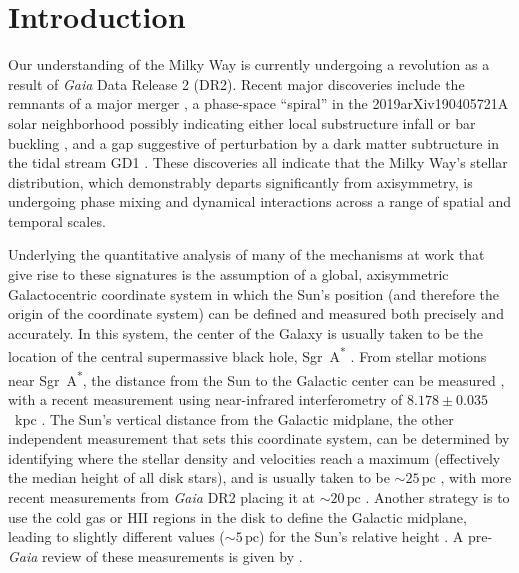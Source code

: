 \documentclass[twocolumn]{aastex62}
\newcommand{\pc}{\text{pc}}
\newcommand{\kpc}{\text{kpc}}
\begin{document}

\section{Introduction} \label{sec:intro}
Our understanding of the Milky Way is currently undergoing a
revolution 
     as a result of {\em Gaia} Data Release 2 (DR2).  Recent major discoveries include the remnants of a
major merger \citep{2018ApJ...860L..11K, 2018Natur.563...85H,
2018arXiv180704290L, 2019MNRAS.482.3426M}, a phase-space ``spiral'' in the 2019arXiv190405721A
solar neighborhood \citep{2018Natur.561..360A} possibly indicating either
local substructure infall \citep{2018MNRAS.481.1501B, 2018arXiv180800451L} or
bar buckling \citep{2018arXiv181109205K}, and a gap suggestive of perturbation
by a dark matter subtructure in the tidal stream GD1
\citep{2018ApJ...863L..20P, 2018arXiv181103631B}. These discoveries all
indicate that the Milky Way's stellar distribution, which demonstrably departs
significantly from axisymmetry, is undergoing phase mixing and dynamical
interactions across a range of spatial and temporal scales.

Underlying the quantitative analysis of many of the mechanisms at work that
give rise to these signatures is the assumption of a global, axisymmetric
Galactocentric coordinate system \citep{2008gady.book.....B} in which the
Sun's position (and therefore the origin of the coordinate system) can be
defined and measured both precisely and accurately. In this system, the center
of the Galaxy is usually taken to be the location of the central supermassive
black hole, Sgr~A\textsuperscript{*} \citep[e.g.][]{2004ApJ...616..872R}. From
stellar motions near Sgr~A\textsuperscript{*}, the distance from the Sun to
the Galactic center
    can be measured
\citep{2009ApJ...692.1075G,2018AA...615L..15G}, with a recent 
    measurement using near-infrared interferometry of $8.178 \pm
    0.035$~kpc 
\citep{2019arXiv190405721A}. The Sun's vertical distance
from the Galactic midplane, the other independent measurement that sets this
coordinate system, can be determined by identifying where the stellar density
and velocities reach a maximum (effectively the median height of all disk
stars), and is usually taken to be $\sim 25\,\pc$ \citep{2001ApJ...553..184C},
with more recent measurements from {\em Gaia} DR2 placing it at $\sim 20\,\pc$
\citep{2019MNRAS.482.1417B}. Another strategy is to use the cold gas or HII
regions in the disk to define the Galactic midplane, leading to slightly
different values ($\sim 5\,\pc$) for the Sun's relative height
\citep[e.g.][]{2019ApJ...871..145A}. A pre-{\em Gaia} review of these
measurements is given by \citet{2016ARAA..54..529B}.
\end{document}
